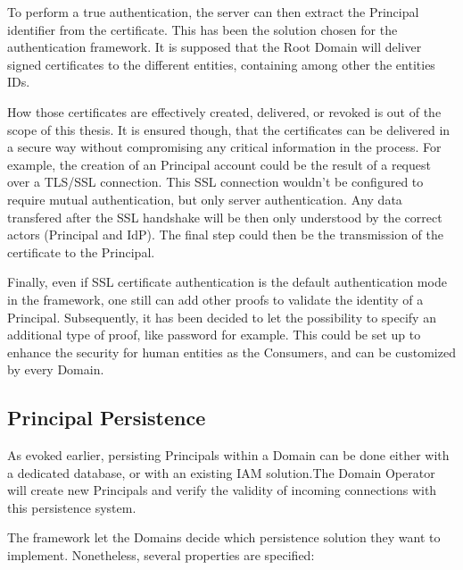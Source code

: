 To perform a true authentication, the server can then extract the Principal identifier from the certificate. This has been the solution chosen for the authentication framework. It is supposed that the Root Domain will deliver signed certificates to the different entities, containing among other the entities IDs.

How those certificates are effectively created, delivered, or revoked is out of the scope of this thesis. It is ensured though, that the certificates can be delivered in a secure way without compromising any critical information in the process. For example, the creation of an Principal account could be the result of a request over a TLS/SSL connection. This SSL connection wouldn't be configured to require mutual authentication, but only server authentication. Any data transfered after the SSL handshake will be then only understood by the correct actors (Principal and IdP). The final step could then be the transmission of the certificate to the Principal.

Finally, even if SSL certificate authentication is the default authentication mode in the framework, one still can add other proofs to validate the identity of a Principal. Subsequently, it has been decided to let the possibility to specify an additional type of proof, like password for example. This could be set up to enhance the security for human entities as the Consumers, and can be customized by every Domain.

\subsection{Principal Persistence}

As evoked earlier, persisting Principals within a Domain can be done either with a dedicated database, or with an existing IAM solution.The Domain Operator will create new Principals and verify the validity of incoming connections with this persistence system.

The framework let the Domains decide which persistence solution they want to implement. Nonetheless, several properties are specified:

